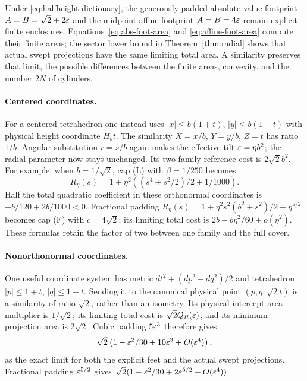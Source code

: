 Under \eqref{eq:halfheight-dictionary}, the generously padded
absolute-value footprint $A=B=\sqrt2+2\varepsilon$ and the midpoint affine
footprint $A=B=4\varepsilon$ remain explicit finite enclosures.
Equations~\eqref{eq:abs-foot-area} and \eqref{eq:affine-foot-area} compute
their finite areas; the sector lower bound in Theorem~\ref{thm:radial}
shows that actual swept projections have the same limiting total area.
A similarity preserves that limit, the possible differences between the
finite areas, convexity, and the number $2N$ of cylinders.

\paragraph{Centered coordinates.}
For a centered tetrahedron one instead uses
$|x|\le b(1+t)$, $|y|\le b(1-t)$ with physical height coordinate
$H_bt$. The similarity $X=x/b$, $Y=y/b$, $Z=t$ has ratio $1/b$.
Angular substitution $r=s/b$ again makes the effective tilt
$\varepsilon=\eta b^2$; the radial parameter now stays unchanged.
Its two-family reference cost is $2\sqrt2 b^2$. For example, when
$b=1/\sqrt2$, cap (L) with $\beta=1/250$ becomes
\[
 R_\eta(s)=1+\eta^2\left((s^4+s^2/2)/2+1/1000\right).
\]
Half the total quadratic coefficient in these orthonormal coordinates
is $-b/120+2b/1000<0$. Fractional padding
$R_\eta(s)=1+\eta^2s^2(b^2+s^2)/2+\eta^{5/2}$ becomes cap (F)
with $c=4\sqrt2$; its limiting total cost is
$2b-b\eta^2/60+o(\eta^2)$. These formulas retain the factor of two
between one family and the full cover.

\paragraph{Nonorthonormal coordinates.}
One useful coordinate system has metric
$dt^2+(dp^2+dq^2)/2$ and tetrahedron
$|p|\le1+t$, $|q|\le1-t$. Sending it to the canonical physical point
$(p,q,\sqrt2 t)$ is a similarity of ratio $\sqrt2$, rather than an
isometry. Its physical intercept area multiplier is $1/\sqrt2$;
its limiting total cost is $\sqrt2 Q_R(\varepsilon)$, and its minimum projection
area is $2\sqrt2$. Cubic padding $5\varepsilon^3$ therefore gives
\[
 \sqrt2\left(1-\varepsilon^2/30+10\varepsilon^3+O(\varepsilon^4)\right),
\]
as the exact limit for both the explicit feet and the actual swept
projections. Fractional padding $\varepsilon^{5/2}$ gives
$\sqrt2(1-\varepsilon^2/30+2\varepsilon^{5/2}+O(\varepsilon^4))$.

